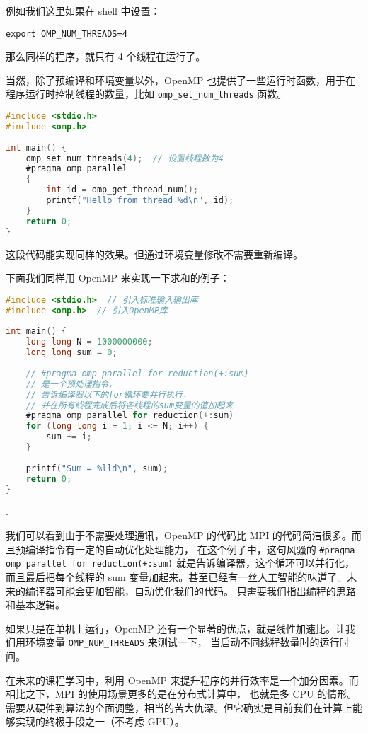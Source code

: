 \documentclass{ctexart}
\begin{document}
例如我们这里如果在 shell 中设置：
\begin{verbatim}
export OMP_NUM_THREADS=4
\end{verbatim}
那么同样的程序，就只有 4 个线程在运行了。

当然，除了预编译和环境变量以外，OpenMP 也提供了一些运行时函数，用于在程序运行时控制线程的数量，比如 \verb|omp_set_num_threads| 函数。
\begin{lstlisting}[language=C]
#include <stdio.h>  
#include <omp.h>  
          
int main() {  
    omp_set_num_threads(4);  // 设置线程数为4  
    #pragma omp parallel  
    {  
        int id = omp_get_thread_num();  
        printf("Hello from thread %d\n", id);  
    }  
    return 0;  
}  
\end{lstlisting}

这段代码能实现同样的效果。但通过环境变量修改不需要重新编译。

下面我们同样用 OpenMP 来实现一下求和的例子：

\begin{lstlisting}[language=C]  
#include <stdio.h>  // 引入标准输入输出库  
#include <omp.h>  // 引入OpenMP库  
      
int main() {    
    long long N = 1000000000;   
    long long sum = 0;  
        
    // #pragma omp parallel for reduction(+:sum) 
    // 是一个预处理指令，  
    // 告诉编译器以下的for循环要并行执行，
    // 并在所有线程完成后将各线程的sum变量的值加起来  
    #pragma omp parallel for reduction(+:sum)    
    for (long long i = 1; i <= N; i++) {    
        sum += i;  
    }    
        
    printf("Sum = %lld\n", sum);  
    return 0;    
}  
\end{lstlisting}  .

我们可以看到由于不需要处理通讯，OpenMP 的代码比 MPI 的代码简洁很多。而且预编译指令有一定的自动优化处理能力，
在这个例子中，这句风骚的 \verb|#pragma omp parallel for reduction(+:sum)| 就是告诉编译器，这个循环可以并行化，
而且最后把每个线程的 sum 变量加起来。甚至已经有一丝人工智能的味道了。未来的编译器可能会更加智能，自动优化我们的代码。
只需要我们指出编程的思路和基本逻辑。

如果只是在单机上运行，OpenMP 还有一个显著的优点，就是线性加速比。让我们用环境变量 \verb|OMP_NUM_THREADS| 来测试一下，
当启动不同线程数量时的运行时间。

在未来的课程学习中，利用 OpenMP 来提升程序的并行效率是一个加分因素。而相比之下，MPI 的使用场景更多的是在分布式计算中，
也就是多 CPU 的情形。需要从硬件到算法的全面调整，相当的苦大仇深。但它确实是目前我们在计算上能够实现的终极手段之一（不考虑 GPU）。
\end{document}
